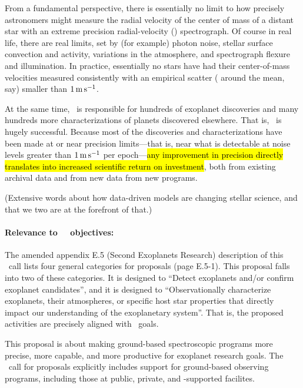 \documentclass[12pt, letterpaper]{article}
\begin{document}
\sloppy\sloppypar\raggedbottom\frenchspacing


\noindent
From a fundamental perspective, there is essentially no limit to how
precisely astronomers might measure the radial velocity of the center of mass
of a distant star with an extreme precision radial-velocity (\EPRV) spectrograph.
Of course in real life, there are real limits, set
by (for example) photon noise, stellar surface convection and activity,
variations in the atmosphere, and spectrograph flexure and illumination. In practice,
essentially no stars have had their center-of-mass velocities measured
consistently with an empirical scatter ( around the mean,
say) smaller than $1\,{\mathrm{m\,s^{-1}}}$.

At the same time, \EPRV\ is responsible for hundreds of 
exoplanet discoveries and many hundreds more 
characterizations of planets
discovered elsewhere. That is, \EPRV\ is hugely successful.
Because most of the discoveries and characterizations have been made
at or near precision limits---that is, near what is detectable at noise levels
greater than $1\,{\mathrm{m\,s^{-1}}}$ per epoch---\hl{any improvement in precision directly
translates into increased scientific return on investment},
both from existing archival data and from new data from new programs.

(Extensive words about how data-driven models are changing stellar science, and
that we two are at the forefront of that.)

\paragraph{Relevance to \NASA\ \XRP\ objectives:} The 
amended appendix E.5 (Second Exoplanets Research) description of this
\XRP\ call lists four general categories for proposals (page
E.5-1). This proposal falls into two of these categories. It is
designed to ``Detect exoplanets and/or confirm exoplanet candidates'',
and it is designed to ``Observationally characterize exoplanets, their
atmospheres, or specific host star properties that directly impact our
understanding of the exoplanetary system''. That is, the proposed activities
are precisely aligned with \XRP\ goals.

This proposal is about making ground-based spectroscopic programs more
precise, more capable, and more productive for exoplanet research
goals. The \XRP\ call for proposals explicitly includes support for
ground-based observing programs, including those at public, private,
and \NASA-supported facilites.
\end{document}

